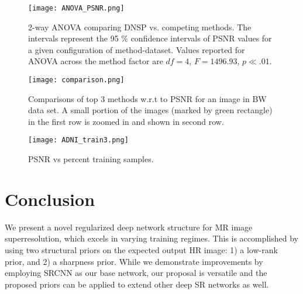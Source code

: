 \documentclass{article}
\def\sqz{\vspace{-3pt}}
\begin{document}
 \begin{figure}
 \begin{center}
  \texttt{[image: ANOVA\_PSNR.png]}
 \end{center}
  \vspace{-.5cm}
  \caption{\small{2-way ANOVA comparing DNSP vs. competing methods. The intervals represent the 95 $\%$ confidence intervals of PSNR values for a given configuration of method-dataset. Values reported for ANOVA across the method factor are $df = 4$, $F = 1496.93$, $p\ll .01$.}}\vspace{-10pt}
  \label{fig:ANOVA}
\end{figure}

\begin{figure}
 \begin{center}
  \texttt{[image: comparison.png]}
 \end{center}
  \vspace{-.5cm}
  \caption{\small{Comparisons of top 3 methods w.r.t to PSNR for an image in BW data set. A small portion of the images (marked by green rectangle) in the first row is zoomed in and shown in second row.}}  \vspace{-15pt}
  \label{fig:images}
\end{figure}

\begin{figure}[h]
	\begin{center}
		\texttt{[image: ADNI\_train3.png]}
	\end{center}
	\vspace{-.5cm}
	\caption{\small{PSNR vs percent training samples.}}
	\label{fig:trainPlot}
\end{figure}

\vspace{-.5cm}\sqz\sqz
\section{Conclusion}
\label{sec:Conclusion}
\sqz\sqz
We present a novel regularized deep network structure for MR image superresolution, which excels in varying training regimes. This is accomplished by using two structural priors on the expected output HR image: 1) a low-rank prior, and 2) a sharpness prior. While we demonstrate improvements by employing SRCNN \cite{dong2016image} as our base network, our proposal is versatile and the proposed priors can be applied to extend other deep SR networks \cite{kim2016accurate, wang2015deep,timofte2017ntire,kim2016deeply} as well.




\ninept

\end{document}
